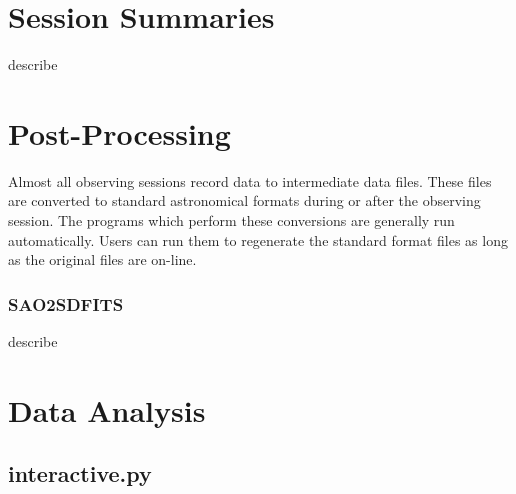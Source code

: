 \documentclass[letterpaper,11pt]{book}
\begin{document}
\section{Session Summaries}

describe

\section{Post-Processing}

Almost all observing sessions record data to intermediate data files.  These
files are converted to standard astronomical formats during or after the
observing session. The programs which perform these conversions are generally
run automatically.  Users can run them to regenerate the standard format files
as long as the original files are on-line.

\subsubsection{\ttfamily SAO2SDFITS}

describe

\section{Data Analysis}

\subsection{\ttfamily interactive.py}\label{sec:interact}
\end{document}
